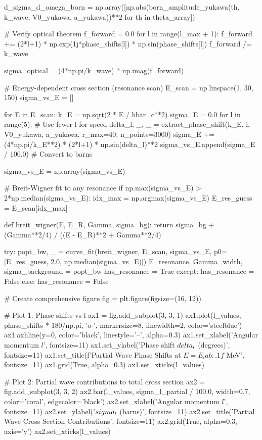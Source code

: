\documentclass[a4paper, 11pt]{article}
\begin{document}
\begin{pycode}
d_sigma_d_omega_born = np.array([np.abs(born_amplitude_yukawa(th, k_wave, V0_yukawa, a_yukawa))**2
                                  for th in theta_array])

# Verify optical theorem
f_forward = 0.0
for l in range(l_max + 1):
    f_forward += (2*l+1) * np.exp(1j*phase_shifts[l]) * np.sin(phase_shifts[l])
f_forward /= k_wave

sigma_optical = (4*np.pi/k_wave) * np.imag(f_forward)

# Energy-dependent cross section (resonance scan)
E_scan = np.linspace(1, 30, 150)
sigma_vs_E = []

for E in E_scan:
    k_E = np.sqrt(2 * E / hbar_c**2)
    sigma_E = 0.0
    for l in range(5):  # Use fewer l for speed
        delta_l, _, _ = extract_phase_shift(k_E, l, V0_yukawa, a_yukawa, r_max=40, n_points=3000)
        sigma_E += (4*np.pi/k_E**2) * (2*l+1) * np.sin(delta_l)**2
    sigma_vs_E.append(sigma_E / 100.0)  # Convert to barns

sigma_vs_E = np.array(sigma_vs_E)

# Breit-Wigner fit to any resonance
if np.max(sigma_vs_E) > 2*np.median(sigma_vs_E):
    idx_max = np.argmax(sigma_vs_E)
    E_res_guess = E_scan[idx_max]

    def breit_wigner(E, E_R, Gamma, sigma_bg):
        return sigma_bg + (Gamma**2/4) / ((E - E_R)**2 + Gamma**2/4)

    try:
        popt_bw, _ = curve_fit(breit_wigner, E_scan, sigma_vs_E,
                               p0=[E_res_guess, 2.0, np.median(sigma_vs_E)])
        E_resonance, Gamma_width, sigma_background = popt_bw
        has_resonance = True
    except:
        has_resonance = False
else:
    has_resonance = False

# Create comprehensive figure
fig = plt.figure(figsize=(16, 12))

# Plot 1: Phase shifts vs l
ax1 = fig.add_subplot(3, 3, 1)
ax1.plot(l_values, phase_shifts * 180/np.pi, 'o-', markersize=8, linewidth=2, color='steelblue')
ax1.axhline(y=0, color='black', linestyle='--', alpha=0.3)
ax1.set_xlabel('Angular momentum $l$', fontsize=11)
ax1.set_ylabel('Phase shift $\\delta_l$ (degrees)', fontsize=11)
ax1.set_title(f'Partial Wave Phase Shifts at $E = {E_lab:.1f}$ MeV', fontsize=11)
ax1.grid(True, alpha=0.3)
ax1.set_xticks(l_values)

# Plot 2: Partial wave contributions to total cross section
ax2 = fig.add_subplot(3, 3, 2)
ax2.bar(l_values, sigma_l_partial / 100.0, width=0.7, color='coral', edgecolor='black')
ax2.set_xlabel('Angular momentum $l$', fontsize=11)
ax2.set_ylabel('$\\sigma_l$ (barns)', fontsize=11)
ax2.set_title('Partial Wave Cross Section Contributions', fontsize=11)
ax2.grid(True, alpha=0.3, axis='y')
ax2.set_xticks(l_values)


\end{pycode}
\end{document}
